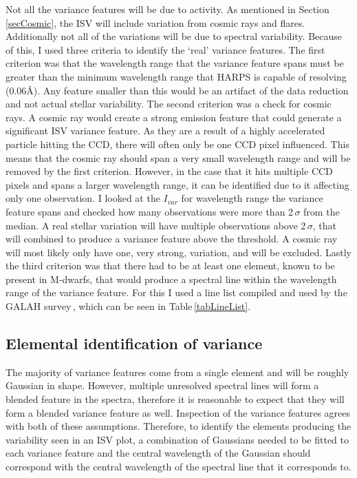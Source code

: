 Not all the variance features will be due to activity. As mentioned in Section\,\ref{secCosmic}, the ISV will include variation from cosmic rays and flares. Additionally not all of the variations will be due to spectral variability. Because of this, I used three criteria to identify the `real' variance features. The first criterion was that the wavelength range that the variance feature spans must be greater than the minimum wavelength range that HARPS is capable of resolving (0.06\AA). Any feature smaller than this would be an artifact of the data reduction and not actual stellar variability. The second criterion was a check for cosmic rays. A cosmic ray would create a strong emission feature that could generate a significant ISV variance feature. As they are a result of a highly accelerated particle hitting the CCD, there will often only be one CCD pixel influenced. This means that the cosmic ray should span a very small wavelength range and will be removed by the first criterion. However, in the case that it hits multiple CCD pixels and spans a larger wavelength range, it can be identified due to it affecting only one observation. I looked at the $I_{var}$ for wavelength range the variance feature spans and checked how many observations were more than 2\,$\sigma$ from the median. A real stellar variation will have multiple observations above 2\,$\sigma$, that will combined to produce a variance feature above the threshold. A cosmic ray will most likely only have one, very strong, variation, and will be excluded. Lastly the third criterion was that there had to be at least one element, known to be present in M-dwarfs, that would produce a spectral line within the wavelength range of the variance feature. For this I used a line list compiled and used by the GALAH survey\,\citep{2015DeSilva}, which can be seen in Table\,\ref{tabLineList}. \\

\subsection{Elemental identification of variance}
The majority of variance features come from a single element and will be roughly Gaussian in shape. However, multiple unresolved spectral lines will form a blended feature in the spectra, therefore it is reasonable to expect that they will form a blended variance feature as well. Inspection of the variance features agrees with both of these assumptions. Therefore, to identify the elements producing the variability seen in an ISV plot, a combination of Gaussians needed to be fitted to each variance feature and the central wavelength of the Gaussian should correspond with the central wavelength of the spectral line that it corresponds to.\\

